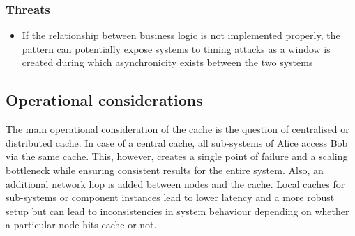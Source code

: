 \documentclass[10pt,a4paper]{article}
\begin{document}
\subsubsection{Threats}	
	 	\begin{itemize}
			\item If the relationship between business logic is not implemented properly, the pattern can potentially expose systems to timing attacks as a window is created during which asynchronicity exists between the two systems
		\end{itemize}

\subsection{Operational considerations}
The main operational consideration of the cache is the question of centralised or distributed cache. In case of a central cache, all sub-systems of Alice access Bob via the same cache. This, however, creates a single point of failure and a scaling bottleneck while ensuring consistent results for the entire system. Also, an additional network hop is added between nodes and the cache. Local caches for sub-systems or component instances lead to lower latency and a more robust setup but can lead to inconsistencies in system behaviour depending on whether a particular node hits cache or not. 
\end{document}
